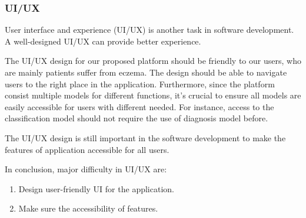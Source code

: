         \subsubsection{UI/UX}
            User interface and experience (UI/UX) is another task in software development. A well-designed UI/UX can provide better experience.

            The UI/UX design for our proposed platform should be friendly to our users, who are mainly patients suffer from eczema. The design should be able to navigate users to the right place in the application. Furthermore, since the platform consist multiple models for different functions, it's crucial to ensure all models are easily accessible for users with different needed. For instance, access to the classification model should not require the use of diagnosis model before.

            The UI/UX design is still important in the software development to make the features of application accessible for all users.

            In conclusion, major difficulty in UI/UX are:
            \begin{enumerate}
                \item Design user-friendly UI for the application.
                \item Make sure the accessibility of features.
            \end{enumerate}